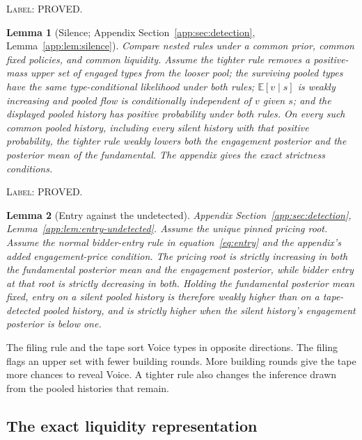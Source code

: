 \documentclass[11pt]{article}
\newtheorem{lemma}{Lemma}
\newcommand{\Eop}{\mathbb{E}}
\begin{document}
\noindent\textsc{Label: PROVED.}\par
\begin{lemma}[Silence; Appendix Section~\ref{app:sec:detection}, Lemma~\ref{app:lem:silence}]
\label{lem:silence}
Compare nested rules under a common prior, common fixed policies, and common liquidity. Assume the
tighter rule removes a positive-mass upper set of engaged types from the looser pool; the surviving
pooled types have the same type-conditional likelihood under both rules; $\Eop[v\mid s]$ is weakly
increasing and pooled flow is conditionally independent of $v$ given $s$; and the displayed pooled
history has positive probability under both rules. On every such common pooled history, including
every silent history with that positive probability, the tighter rule weakly lowers both the
engagement posterior and the posterior mean of the fundamental. The appendix gives the exact
strictness conditions.
\end{lemma}

\noindent\textsc{Label: PROVED.}\par
\begin{lemma}[Entry against the undetected]
\label{lem:entry-undetected}
Appendix Section~\ref{app:sec:detection}, Lemma~\ref{app:lem:entry-undetected}. Assume the unique
pinned pricing root. Assume the normal bidder-entry rule in equation~\eqref{eq:entry} and the
appendix's added engagement-price condition. The pricing root is
strictly increasing in both the fundamental posterior mean and the engagement posterior, while
bidder entry at that root is strictly decreasing in both. Holding the fundamental posterior mean
fixed, entry on a silent pooled history is therefore weakly higher than on a tape-detected pooled
history, and is strictly higher when the silent history's engagement posterior is below one.
\end{lemma}

The filing rule and the tape sort Voice types in opposite directions. The filing flags an upper set
with fewer building rounds. More building rounds give the tape more chances to reveal Voice. A
tighter rule also changes the inference drawn from the pooled histories that remain.

\subsection{The exact liquidity representation}
\label{sec:liquidity-representation}
\end{document}
